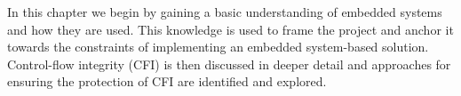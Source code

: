 In this chapter we begin by gaining a basic understanding of embedded systems and how they are used. This knowledge is used to frame the project and anchor it towards the constraints of implementing an embedded system-based solution. Control-flow integrity (CFI) is then discussed in deeper detail and approaches for ensuring the protection of CFI are identified and explored.